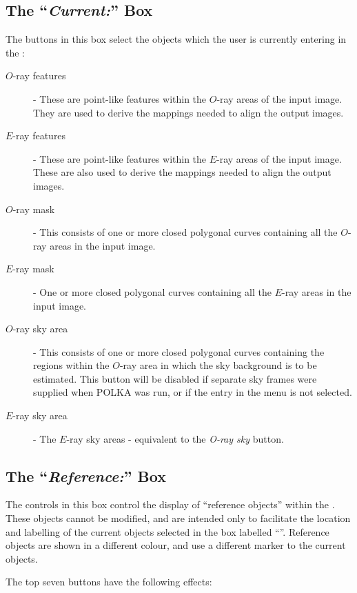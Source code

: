 \subsection {The ``{\em Current:}'' Box}
The buttons in this box select the objects which the user is currently
entering in the :

\begin{description}
\item [$O$-ray features] - These are point-like features within the
$O$-ray areas of the input image. They are used to derive the mappings
needed to align the output images.
\item [$E$-ray features] - These are point-like features within the
$E$-ray areas of the input image. These are also used to derive the mappings
needed to align the output images.
\item [$O$-ray mask] - This consists of one or more closed polygonal curves
containing all the $O$-ray areas in the input image. 
\item [$E$-ray mask] - One or more closed polygonal curves
containing all the $E$-ray areas in the input image. 
\item [$O$-ray sky area] - This consists of one or more closed polygonal curves
containing the regions within the $O$-ray area in which the sky
background is to be estimated. This button will be disabled if 
separate sky frames were supplied when POLKA was run, or if the
 entry in the  menu is not selected.
\item [$E$-ray sky area] - The $E$-ray sky areas - equivalent to the 
{\em O-ray sky} button.
\end{description}

\subsection {The ``{\em Reference:}'' Box}
The controls in this box control the display of ``reference objects''
within the . These
objects cannot be modified, and are intended only to facilitate the location
and labelling of the current objects selected in the box labelled 
``''. Reference objects are
shown in a different colour, and use a different marker to the current
objects.

The top seven buttons have the following effects:

